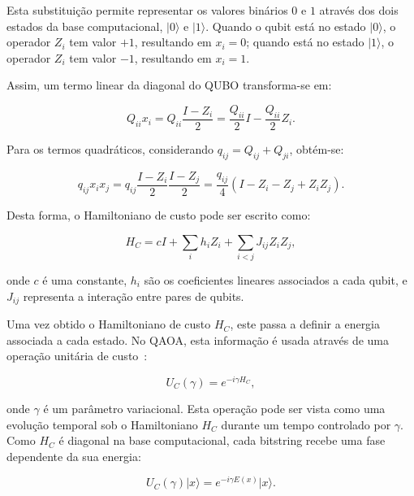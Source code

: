 Esta substituição permite representar os valores binários $0$ e $1$ através dos
dois estados da base computacional, $\lvert 0\rangle$ e $\lvert 1\rangle$. Quando o qubit está no estado $\lvert 0\rangle$, o operador $Z_i$ tem valor
$+1$, resultando em $x_i = 0$; quando está no estado $\lvert 1\rangle$, o operador $Z_i$
tem valor $-1$, resultando em $x_i = 1$.

Assim, um termo linear da diagonal do \acs{QUBO} transforma-se em:

\begin{equation}
    Q_{ii}x_i
    =
    Q_{ii}\frac{I - Z_i}{2}
    =
    \frac{Q_{ii}}{2}I - \frac{Q_{ii}}{2}Z_i.
\end{equation}

Para os termos quadráticos, considerando $q_{ij}=Q_{ij}+Q_{ji}$, obtém-se:

\begin{equation}
    q_{ij}x_ix_j
    =
    q_{ij}\frac{I - Z_i}{2}\frac{I - Z_j}{2}
    =
    \frac{q_{ij}}{4}
    \left(I - Z_i - Z_j + Z_iZ_j\right).
\end{equation}

Desta forma, o Hamiltoniano de custo pode ser escrito como:

\begin{equation}
    H_C =
    cI
    +
    \sum_i h_i Z_i
    +
    \sum_{i<j} J_{ij} Z_iZ_j,
\end{equation}

onde $c$ é uma constante, $h_i$ são os coeficientes lineares associados a cada
qubit, e $J_{ij}$ representa a interação entre pares de qubits.

Uma vez obtido o Hamiltoniano de custo $H_C$, este passa a definir a energia associada a cada estado. No \acs{QAOA}, esta informação é usada através de uma operação unitária de custo~\cite{Farhi2014QAOA}:

\begin{equation}
    U_C(\gamma) = e^{-i\gamma H_C},
\end{equation}

onde $\gamma$ é um parâmetro variacional. Esta operação pode ser vista como uma evolução temporal sob o Hamiltoniano $H_C$ durante um tempo controlado por $\gamma$. Como $H_C$ é diagonal na base computacional, cada bitstring recebe uma fase dependente da sua energia:

\begin{equation}
    U_C(\gamma)\lvert x\rangle
    =
    e^{-i\gamma E(x)}\lvert x\rangle.
\end{equation}


